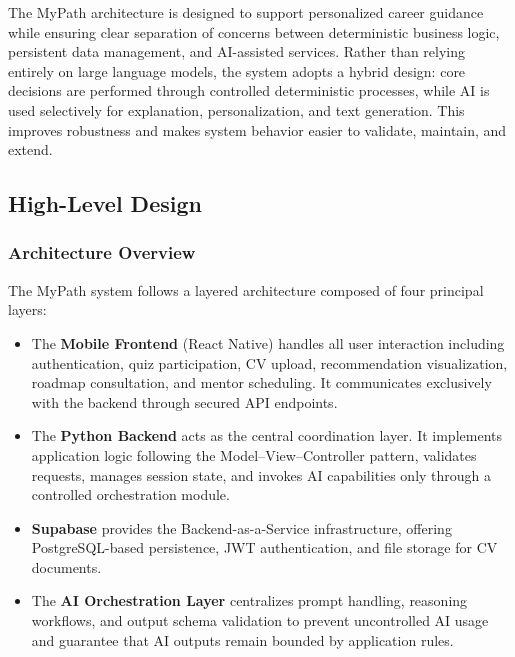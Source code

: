 \documentclass[12pt,a4paper]{article}
\begin{document}
The MyPath architecture is designed to support personalized career guidance while ensuring clear separation of concerns between deterministic business logic, persistent data management, and AI-assisted services. Rather than relying entirely on large language models, the system adopts a hybrid design: core decisions are performed through controlled deterministic processes, while AI is used selectively for explanation, personalization, and text generation. This improves robustness and makes system behavior easier to validate, maintain, and extend.

\subsection{High-Level Design}

\subsubsection{Architecture Overview}

The MyPath system follows a layered architecture composed of four principal layers:

\begin{itemize}
  \item The \textbf{Mobile Frontend} (React Native) handles all user interaction including authentication, quiz participation, CV upload, recommendation visualization, roadmap consultation, and mentor scheduling. It communicates exclusively with the backend through secured API endpoints.
  \item The \textbf{Python Backend} acts as the central coordination layer. It implements application logic following the Model--View--Controller pattern, validates requests, manages session state, and invokes AI capabilities only through a controlled orchestration module.
  \item \textbf{Supabase} provides the Backend-as-a-Service infrastructure, offering PostgreSQL-based persistence, JWT authentication, and file storage for CV documents.
  \item The \textbf{AI Orchestration Layer} centralizes prompt handling, reasoning workflows, and output schema validation to prevent uncontrolled AI usage and guarantee that AI outputs remain bounded by application rules.
\end{itemize}
\end{document}
